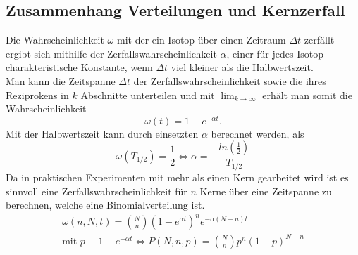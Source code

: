 \documentclass{article}
\begin{document}
	\subsection{Zusammenhang Verteilungen und Kernzerfall}
	Die Wahrscheinlichkeit $\omega$ mit der ein Isotop über einen Zeitraum $\Delta t$ zerfällt ergibt sich mithilfe der Zerfallswahrscheinlichkeit $\alpha$, einer für jedes Isotop charakteristische Konstante, wenn $\Delta t$ viel kleiner als die Halbwertszeit.\\
	Man kann die Zeitspanne $\Delta t$ der Zerfallswahrscheinlichkeit sowie die ihres Reziprokens in $k$ Abschnitte unterteilen und mit $\lim_{k \rightarrow\infty}$ erhält man somit die Wahrscheinlichkeit
	\begin{equation}
	\omega(t)=1-e^{-\alpha t}.
	\end{equation}  
	Mit der Halbwertszeit kann durch einsetzten $\alpha$ berechnet werden, als 
	\begin{equation}
	\omega(T_{1/2})=\frac{1}{2} \Leftrightarrow \alpha=-\frac{ln(\frac{1}{2})}{T_{1/2}}
	\end{equation}
	Da in praktischen Experimenten mit mehr als einen Kern gearbeitet wird ist es sinnvoll eine Zerfallswahrscheinlichkeit für $n$ Kerne über eine Zeitspanne zu berechnen, welche eine Binomialverteilung ist.
	\begin{gather}
	\omega(n,N,t)=\binom{N}{n}(1-e^{\alpha t})^ne^{-\alpha(N-n)t}\\
	\text{mit }p\equiv1-e^{-\alpha t} \Leftrightarrow P(N,n,p)=\binom{N}{n}p^n(1-p)^{N-n}
	\end{gather} 
\end{document}
